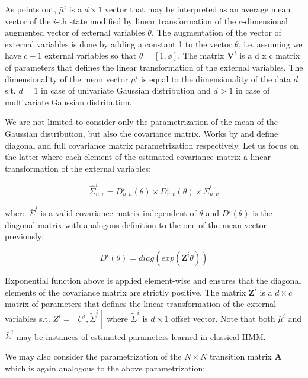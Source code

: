 As \citep{Radenen2014} points out, $\bar{\mu}^{i}$ is a $d \times 1$ vector that may be interpreted as an average mean vector of the $i$-th state modified by 
linear transformation of the $c$-dimensional augmented vector of external variables $\theta$. The augmentation of the vector of external variables is done by adding a constant 1 to the vector $\theta$, 
i.e. assuming we have $c-1$ external variables so that $\theta = [1, \phi]$. The matrix $\textbf{V}^{i}$ is a d x c matrix of parameters that defines the linear transformation of the external variables. \citep{Radenen2014}
The dimensionality of the mean vector $\mu^i$ is equal to the dimensionality of the data $d$ s.t. $d=1$ in case of univariate Gaussian distribution and $d>1$ in case of multivariate Gaussian distribution.

We are not limited to consider only the parametrization of the mean of the Gaussian distribution, but also the covariance matrix. Works by \citep{Bobick1999} and \citep{Radenen2014} define 
diagonal and full covariance matrix parametrization respectively. Let us focus on the latter where each element of the estimated covariance matrix a linear transformation of the external variables:

\begin{equation} \label{eq: sigma_hat}
    \hat{\Sigma}^i_{u,v} = D^i_{u,u}(\theta) \times D^i_{v,v}(\theta) \times \bar{\Sigma}^i_{u,v}
\end{equation}

where $\bar{\Sigma}^i$ is a valid covariance matrix independent of $\theta$ and $D^i(\theta)$ is the diagonal matrix with analogous definition to the one of the mean vector previously: 

\begin{equation} \label{eq: D}
    D^i(\theta) = diag(exp(\textbf{Z}^i \theta))
\end{equation}

\noindent Exponential function above is applied element-wise and ensures that the diagonal elements of the covariance matrix are strictly positive. 
The matrix $\textbf{Z}^i$ is a $d \times c$ matrix of parameters that defines the linear transformation of the external variables s.t. $Z^i = [U^i, \widetilde{\Sigma}^i]$ where 
$\widetilde{\Sigma}^i$ is $d \times 1$ offset vector. Note that both $\bar{\mu}^i$ and $\bar{\Sigma}^i$ may be instances of estimated parameters learned in classical HMM. \citep{Radenen2014} 

We may also consider the parametrization of the $N \times N$ transition matrix $\textbf{A}$ which is again analogous to the above parametrization:

